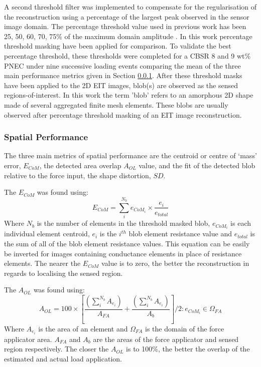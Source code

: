 A second threshold filter was implemented to compensate for the regularisation of the reconstruction using a percentage of the largest peak observed in the sensor image domain. The percentage threshold value used in previous work has been 25, 50, 60, 70, 75\% of the maximum domain amplitude \citep{Adler2009,Visentin2016,Silvera-Tawil2015}. In this work percentage threshold masking have been applied for comparison. To validate the best percentage threshold, these thresholds were completed for a CBSR 8 and 9 wt\% PNEC under nine successive loading events comparing the mean of the three main performance metrics given in Section \ref{sec:Spatial Performance}. After these threshold masks have been applied to the 2D EIT images, blob(s) are observed as the sensed regions-of-interest. In this work the term 'blob' refers to an amorphous 2D shape made of several aggregated finite mesh elements. These blobs are usually observed after percentage threshold masking of an EIT image reconstruction. 

\subsubsection{Spatial Performance}\label{sec:Spatial Performance}
The three main metrics of spatial performance are the centroid or centre of `mass' error, $E_{CoM}$, the detected area overlap $A_{OL}$ value, and the fit of the detected blob relative to the force input, the shape distortion, $S\!D$.

The $E_{CoM}$ was found using:
\begin{equation}
    E_{CoM} = \sum_i^{N_{b}} e_{{CoM}_i} \times \frac{e_i}{e_{total}}
    \label{eqn:err_CoM}
\end{equation}
Where $N_{b}$ is the number of elements in the threshold masked blob, $e_{{CoM}_i}$ is each individual element centroid, $e_i$ is the $i^{th}$ blob element resistance value and $e_{total}$ is the sum of all of the blob element resistance values. This equation can be easily be inverted for images containing conductance elements in place of resistance elements. The nearer the $E_{CoM}$ value is to zero, the better the reconstruction in regards to localising the sensed region.

The $A_{OL}$ was found using:
\begin{equation}
    A_{OL} = 100\times\left[\frac{\left(\sum_i^{N_{b}} A_{e_i}\right)}{A_{FA}} + \frac{\left(\sum_i^{N_{b}} A_{e_i}\right)}{A_{b}}\right]\bigg/2 : e_{{CoM}_i} \in \Omega_{FA}
    \label{eqn:area_overlap}
\end{equation}
Where $A_{e_i}$ is the area of an element and $\Omega_{FA}$ is the domain of the force applicator area. $A_{FA}$ and $A_{b}$ are the areas of the force applicator and sensed region respectively. The closer the $A_{OL}$ is to 100\%, the better the overlap of the estimated and actual load application.

